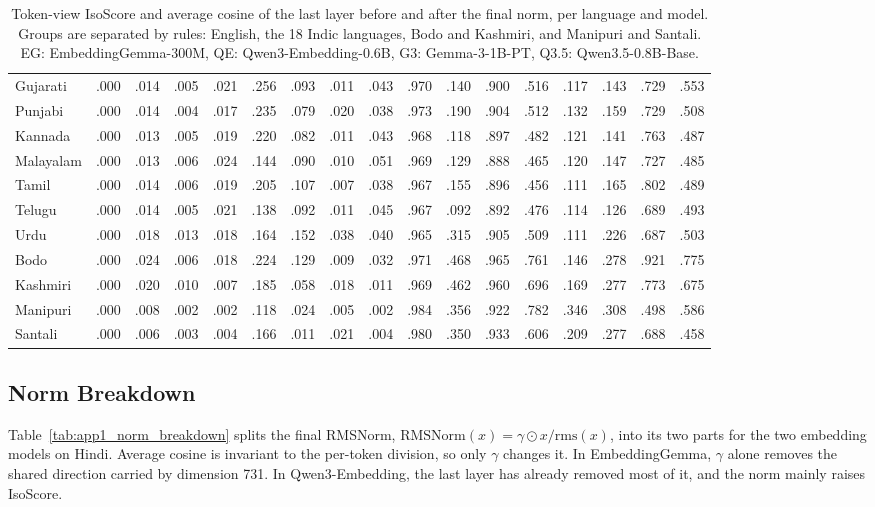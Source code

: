 \begin{table}[tp]
\begin{tabular}{lrrrrrrrrrrrrrrrr}
Gujarati & .000 & .014 & .005 & .021 & .256 & .093 & .011 & .043 & .970 & .140 & .900 & .516 & .117 & .143 & .729 & .553 \\
Punjabi & .000 & .014 & .004 & .017 & .235 & .079 & .020 & .038 & .973 & .190 & .904 & .512 & .132 & .159 & .729 & .508 \\
Kannada & .000 & .013 & .005 & .019 & .220 & .082 & .011 & .043 & .968 & .118 & .897 & .482 & .121 & .141 & .763 & .487 \\
Malayalam & .000 & .013 & .006 & .024 & .144 & .090 & .010 & .051 & .969 & .129 & .888 & .465 & .120 & .147 & .727 & .485 \\
Tamil & .000 & .014 & .006 & .019 & .205 & .107 & .007 & .038 & .967 & .155 & .896 & .456 & .111 & .165 & .802 & .489 \\
Telugu & .000 & .014 & .005 & .021 & .138 & .092 & .011 & .045 & .967 & .092 & .892 & .476 & .114 & .126 & .689 & .493 \\
Urdu & .000 & .018 & .013 & .018 & .164 & .152 & .038 & .040 & .965 & .315 & .905 & .509 & .111 & .226 & .687 & .503 \\
\midrule
Bodo & .000 & .024 & .006 & .018 & .224 & .129 & .009 & .032 & .971 & .468 & .965 & .761 & .146 & .278 & .921 & .775 \\
Kashmiri & .000 & .020 & .010 & .007 & .185 & .058 & .018 & .011 & .969 & .462 & .960 & .696 & .169 & .277 & .773 & .675 \\
\midrule
Manipuri & .000 & .008 & .002 & .002 & .118 & .024 & .005 & .002 & .984 & .356 & .922 & .782 & .346 & .308 & .498 & .586 \\
Santali & .000 & .006 & .003 & .004 & .166 & .011 & .021 & .004 & .980 & .350 & .933 & .606 & .209 & .277 & .688 & .458 \\
\bottomrule
\end{tabular}
\caption{Token-view IsoScore and average cosine of the last layer before and after the final norm, per language and model. Groups are separated by rules: English, the 18 Indic languages, Bodo and Kashmiri, and Manipuri and Santali. EG: EmbeddingGemma-300M, QE: Qwen3-Embedding-0.6B, G3: Gemma-3-1B-PT, Q3.5: Qwen3.5-0.8B-Base.}
\label{tab:app1_languages}
\end{table}

\subsection{Norm Breakdown}
\label{app:app1_norm}
Table~\ref{tab:app1_norm_breakdown} splits the final RMSNorm, $\mathrm{RMSNorm}(x) = \gamma \odot x / \mathrm{rms}(x)$, into its two parts for the two embedding models on Hindi. Average cosine is invariant to the per-token division, so only $\gamma$ changes it. In EmbeddingGemma, $\gamma$ alone removes the shared direction carried by dimension 731. In Qwen3-Embedding, the last layer has already removed most of it, and the norm mainly raises IsoScore.

